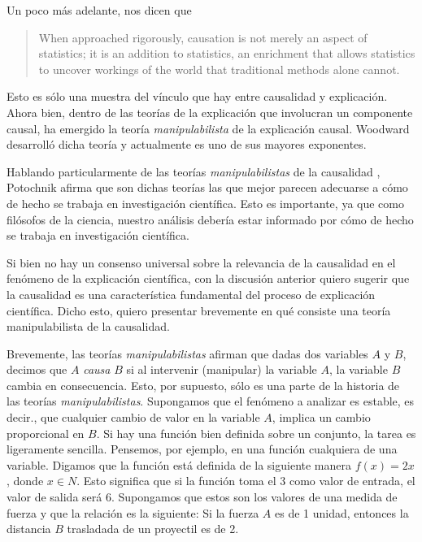 Un poco más adelante, nos dicen que

\begin{quote}
	When approached rigorously, causation is not merely an aspect of
	statistics; it is an addition to statistics, an enrichment that
	allows statistics to uncover workings of the world that
	traditional methods alone cannot.
\end{quote}

Esto es sólo una muestra del vínculo que hay entre causalidad y
explicación. Ahora bien, dentro de las teorías de la explicación que
involucran un componente causal, ha emergido la teoría
\emph{manipulabilista} de la explicación causal. Woodward desarrolló
dicha teoría y actualmente es uno de sus mayores exponentes.

Hablando particularmente de las teorías \emph{manipulabilistas} de
la causalidad \parencite{sep-causation-mani}, Potochnik afirma que
son dichas teorías las que mejor parecen adecuarse a cómo de hecho
se trabaja en investigación científica. Esto es importante, ya que
como filósofos de la ciencia, nuestro análisis debería estar
informado por cómo de hecho se trabaja en investigación
científica.

Si bien no hay un consenso universal sobre la relevancia de la
causalidad en el fenómeno de la explicación científica, con la
discusión anterior quiero sugerir que la causalidad es una
característica fundamental del proceso de explicación científica.
Dicho esto, quiero presentar brevemente en qué consiste una teoría
manipulabilista de la causalidad.

Brevemente, las teorías \emph{manipulabilistas} afirman que dadas dos variables $A$ y $B$, decimos que $A$ \emph{causa} $B$ si al intervenir (manipular) la variable $A$, la variable $B$ cambia en consecuencia.
Esto, por supuesto, sólo es una parte de la historia de las teorías
\emph{manipulabilistas}. Supongamos que el fenómeno a analizar es
estable, es decir., que cualquier cambio de valor en la variable $A$,
implica un cambio proporcional en $B$. Si hay una función bien
definida sobre un conjunto, la tarea es ligeramente sencilla.
Pensemos, por ejemplo, en una función cualquiera de una variable.
Digamos que la función está definida de la siguiente manera $f(x) =
	2x$, donde $x \in {N}$. Esto significa que si la función toma el $3$
como valor de entrada, el valor de salida será $6$. Supongamos que
estos son los valores de una medida de fuerza y que la relación es la
siguiente: Si la fuerza $A$ es de 1 unidad, entonces la distancia $B$
trasladada de un proyectil es de 2.

